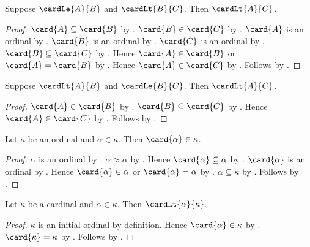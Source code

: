 \begin{theorem}\label{cardinal_le_lt_transitive}
    Suppose $\cardLe{A}{B}$ and $\cardLt{B}{C}$.
    Then $\cardLt{A}{C}$.
\end{theorem}
\begin{proof}
    $\card{A}\subseteq\card{B}$ by
        .
    $\card{B}\in\card{C}$ by .
    $\card{A}$ is an ordinal by .
    $\card{B}$ is an ordinal by .
    $\card{C}$ is an ordinal by .
    $\card{B}\subseteq\card{C}$ by
        .
    Hence $\card{A}\in\card{B}$ or $\card{A}=\card{B}$ by
        .
    Hence $\card{A}\in\card{C}$ by .
    Follows by .
\end{proof}

\begin{theorem}\label{cardinal_lt_le_transitive}
    Suppose $\cardLt{A}{B}$ and $\cardLe{B}{C}$.
    Then $\cardLt{A}{C}$.
\end{theorem}
\begin{proof}
    $\card{A}\in\card{B}$ by .
    $\card{B}\subseteq\card{C}$ by
        .
    Hence $\card{A}\in\card{C}$ by .
    Follows by .
\end{proof}

\begin{lemma}\label{card_of_ordinal_below}
    Let $\kappa$ be an ordinal and $\alpha\in\kappa$.
    Then $\card{\alpha}\in\kappa$.
\end{lemma}
\begin{proof}
    $\alpha$ is an ordinal by .
    $\alpha\approx\alpha$ by .
    Hence $\card{\alpha}\subseteq\alpha$ by
        .
    $\card{\alpha}$ is an ordinal by .
    Hence $\card{\alpha}\in\alpha$ or $\card{\alpha}=\alpha$ by
        .
    $\alpha\subseteq\kappa$ by .
    Follows by .
\end{proof}

\begin{corollary}\label{cardinal_element_small}
    Let $\kappa$ be a cardinal and $\alpha\in\kappa$.
    Then $\cardLt{\alpha}{\kappa}$.
\end{corollary}
\begin{proof}
    $\kappa$ is an initial ordinal by definition.
    Hence $\card{\alpha}\in\kappa$ by .
    $\card{\kappa}=\kappa$ by .
    Follows by .
\end{proof}


